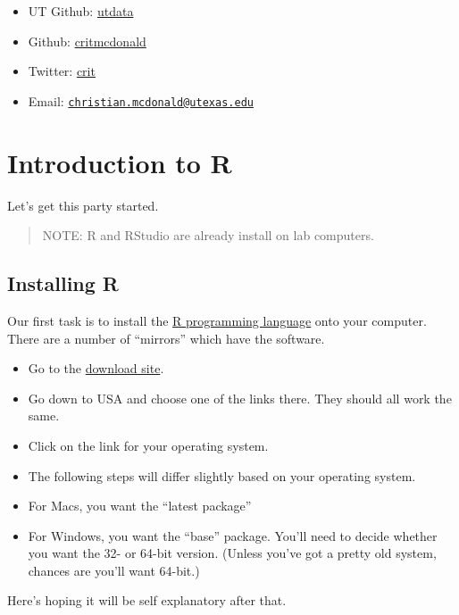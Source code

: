 \documentclass[]{book}
\providecommand{\tightlist}{%
  \setlength{\itemsep}{0pt}\setlength{\parskip}{0pt}}
\begin{document}
\begin{itemize}
\tightlist
\item
  UT Github: \href{https://github.com/utdata}{utdata}
\item
  Github:
  \href{https://github.com/critmcdonald?tab=repositories}{critmcdonald}
\item
  Twitter: \href{https://twitter.com/crit}{crit}
\item
  Email:
  \href{mailto:christian.mcdonald@utexas.edu}{\nolinkurl{christian.mcdonald@utexas.edu}}
\end{itemize}

\chapter{Introduction to R}\label{intro}

Let's get this party started.

\begin{quote}
NOTE: R and RStudio are already install on lab computers.
\end{quote}

\section{Installing R}\label{installing-r}

Our first task is to install the \href{https://www.r-project.org/}{R
programming language} onto your computer. There are a number of
``mirrors'' which have the software.

\begin{itemize}
\tightlist
\item
  Go to the \href{https://cran.r-project.org/mirrors.html}{download
  site}.
\item
  Go down to USA and choose one of the links there. They should all work
  the same.
\item
  Click on the link for your operating system.
\item
  The following steps will differ slightly based on your operating
  system.
\item
  For Macs, you want the ``latest package''
\item
  For Windows, you want the ``base'' package. You'll need to decide
  whether you want the 32- or 64-bit version. (Unless you've got a
  pretty old system, chances are you'll want 64-bit.)
\end{itemize}

Here's hoping it will be self explanatory after that.
\end{document}
